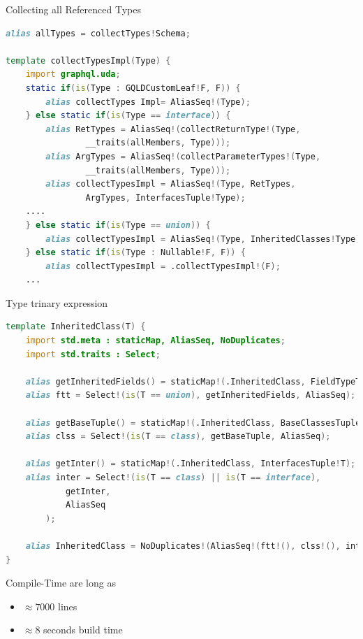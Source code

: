 \documentclass[aspectratio=169,notes]{beamer}
\begin{document}
	\begin{frame}[fragile]{Collecting all Referenced Types}
\begin{lstlisting}[language=D,basicstyle=\scriptsize\ttfamily]
alias allTypes = collectTypes!Schema;

template collectTypesImpl(Type) {
	import graphql.uda;
	static if(is(Type : GQLDCustomLeaf!F, F)) {
		alias collectTypes Impl= AliasSeq!(Type);
	} else static if(is(Type == interface)) {
		alias RetTypes = AliasSeq!(collectReturnType!(Type,
				__traits(allMembers, Type)));
		alias ArgTypes = AliasSeq!(collectParameterTypes!(Type,
				__traits(allMembers, Type)));
		alias collectTypesImpl = AliasSeq!(Type, RetTypes, 
				ArgTypes, InterfacesTuple!Type);
	....
	} else static if(is(Type == union)) {
		alias collectTypesImpl = AliasSeq!(Type, InheritedClasses!Type);
	} else static if(is(Type : Nullable!F, F)) {
		alias collectTypesImpl = .collectTypesImpl!(F);
	...
\end{lstlisting}
\end{frame}

\begin{frame}[fragile]{Type trinary expression}
\begin{lstlisting}[language=D,basicstyle=\scriptsize\ttfamily]
template InheritedClass(T) {
	import std.meta : staticMap, AliasSeq, NoDuplicates;
	import std.traits : Select;

	alias getInheritedFields() = staticMap!(.InheritedClass, FieldTypeTuple!T);
	alias ftt = Select!(is(T == union), getInheritedFields, AliasSeq);

	alias getBaseTuple() = staticMap!(.InheritedClass, BaseClassesTuple!T);
	alias clss = Select!(is(T == class), getBaseTuple, AliasSeq);

	alias getInter() = staticMap!(.InheritedClass, InterfacesTuple!T);
	alias inter = Select!(is(T == class) || is(T == interface),
			getInter, 
			AliasSeq
		);

	alias InheritedClass = NoDuplicates!(AliasSeq!(ftt!(), clss!(), inter!()));
}
\end{lstlisting}
\end{frame}

	\begin{frame}[fragile]{Compile-Time are long as}
		\Large
		\begin{itemize}
			\item $\approx{} 7000$ lines
			\item $\approx{} 8$ seconds build time
		\end{itemize}
	\end{frame}
\end{document}
